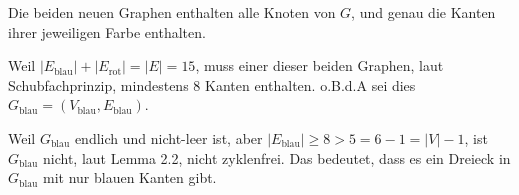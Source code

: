 \begin{solution}
Die beiden neuen Graphen enthalten alle Knoten von $G$, und genau die Kanten ihrer jeweiligen Farbe enthalten.

Weil $|E_{\text{blau}}| + |E_{\text{rot}}| = |E| = 15$, muss einer dieser beiden Graphen, laut Schubfachprinzip, mindestens $8$ Kanten enthalten.
o.B.d.A sei dies $G_{\text{blau}} = (V_{\text{blau}}, E_{\text{blau}})$.


Weil $G_{\text{blau}}$ endlich und nicht-leer ist, aber $|E_{\text{blau}}| \geq 8 > 5 = 6 - 1 = |V| - 1$, ist $G_{\text{blau}}$ nicht, laut Lemma 2.2, nicht zyklenfrei.
Das bedeutet, dass es ein Dreieck in $G_{\text{blau}}$ mit nur blauen Kanten gibt.

\end{solution}

